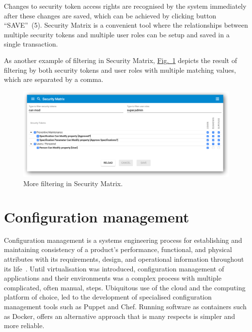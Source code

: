 \documentclass[a4paper,12pt,oneside,openright]{memoir}
\begin{document}
	Changes to security token access rights are recognised by the system immediately after these changes are saved, which can be achieved by clicking button ``SAVE''~(5).
	Security Matrix is a convenient tool where the relationships between multiple security tokens and multiple user roles can be setup and saved in a single transaction.

	As another example of filtering in Security Matrix, \hyperref[sec:03_01:fig:6]{Fig.~\ref*{sec:03_01:fig:6}} depicts the result of filtering by both security tokens and user roles with multiple matching values, which are separated by a comma.

	\begin{figure}[h!tbp]
	\centering
	\includegraphics[width=0.9\linewidth]{images/11-security-matrix-filtering-can-modif-and-roles.png}
	\caption{More filtering in Security Matrix.}\label{sec:03_01:fig:6}
	\end{figure}

\section*{Configuration management}\label{sec:04}
	Configuration management is a systems engineering process for establishing and maintaining consistency of a product's performance, functional, and physical attributes with its requirements, design, and operational information throughout its life~\cite{CM}.
	Until virtualisation was introduced, configuration management of applications and their environments was a complex process with multiple complicated, often manual, steps.
	Ubiquitous use of the cloud and the computing platform of choice, led to the development of specialised configuration management tools such as Puppet and Chef.
	Running software as containers such as Docker, offers an alternative approach that is many respects is simpler and more reliable.
\end{document}
